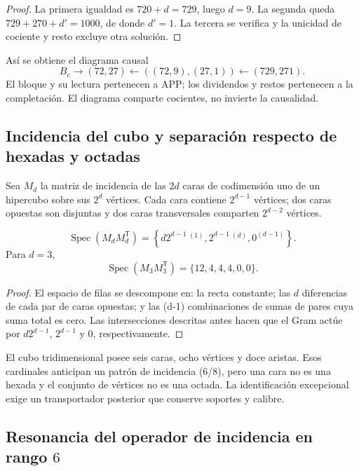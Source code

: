 \begin{proof}
La primera igualdad es \(720+d=729\), luego \(d=9\). La segunda queda
\(729+270+d'=1000\), de donde \(d'=1\). La tercera se verifica y la
unicidad de cociente y resto excluye otra solución.
\end{proof}

Así se obtiene el diagrama causal
\[
 B_c\longrightarrow(72,27)
 \longleftarrow((72,9),(27,1))
 \longleftarrow(729,271).
\]
El bloque y su lectura pertenecen a APP; los dividendos y restos pertenecen
a la completación. El diagrama comparte cocientes, no invierte la
causalidad.

\subsection{Incidencia del cubo y separación respecto de hexadas y octadas}

Sea \(M_d\) la matriz de incidencia de las \(2d\) caras de codimensión uno
de un hipercubo sobre sus \(2^d\) vértices. Cada cara contiene
\(2^{d-1}\) vértices; dos caras opuestas son disjuntas y dos caras
transversales comparten \(2^{d-2}\) vértices.

\begin{theorem}
\label{p12-83-c1-s5:thm:espectro-incidencia-cubo-autonomo}
\[
 \operatorname{Spec}(M_dM_d^{\mathsf T})
 =\left\{
 d2^{d-1}\,^{(1)},
 2^{d-1}\,^{(d)},
 0^{(d-1)}
 \right\}.
\]
Para \(d=3\),
\[
 \operatorname{Spec}(M_3M_3^{\mathsf T})
 =\{12,4,4,4,0,0\}.
\]
\end{theorem}

\begin{proof}
El espacio de filas se descompone en: la recta constante; las \(d\)
diferencias de cada par de caras opuestas; y las (d-1) combinaciones de
sumas de pares cuya suma total es cero. Las intersecciones descritas antes
hacen que el Gram actúe por \(d2^{d-1}\), \(2^{d-1}\) y \(0\),
respectivamente.
\end{proof}

El cubo tridimensional posee seis caras, ocho vértices y doce aristas. Esos
cardinales anticipan un patrón de incidencia (6/8), pero una cara no es
una hexada y el conjunto de vértices no es una octada. La identificación
excepcional exige un transportador posterior que conserve soportes y
calibre.

\subsection{Resonancia del operador de incidencia en rango \(6\)}

